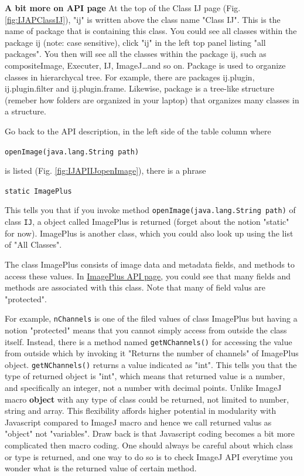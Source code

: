 \documentclass[11pt,a4paper,oneside]{report}
\newcommand{\ilcom}[1]{\texttt{\small#1}}
\begin{document}
 \textbf{A bit more on API page} At the top of the Class IJ page (Fig.\ref{fig:IJAPClassIJ}),  "ij" is written above the class name "Class IJ". This is the name of package that is containing this class. You could see all classes within the package ij (note: case sensitive), click "ij" in the left top panel listing "all packages".  You then will see all the classes within the package ij, such as compositeImage, Executer, IJ, ImageJ\dots and so on. Package is used to organize classes in hierarchycal tree. For example, there are packages ij.plugin, ij.plugin.filter and ij.plugin.frame. Likewise, package is a tree-like structure (remeber how folders are organized in your laptop) that organizes many classes in a structure. 
  
Go back to the API description, in the left side of the table column   where 

\ilcom{openImage(java.lang.String path) } 

is listed (Fig. \ref{fig:IJAPIIJopenImage}), there is a phrase 

\ilcom{static ImagePlus} 

This tells you that if you invoke method \ilcom{openImage(java.lang.String path)} of class \ilcom{IJ}, a object called ImagePlus is returned (forget about the notion "static" for now). ImagePlus is another class, which you could also look up using the list of "All Classes".  

The class ImagePlus consists of image data and metadata fields, and methods to access these values. In \href{http://rsb.info.nih.gov/ij/developer/api/ij/ImagePlus.html}{ImagePlus API page}, you could see that many fields and methods are associated with this class. Note that many of field valus are "protected". 

For example, \ilcom{nChannels} is one of the filed values of class ImagePlus but having a notion "protected" means that you cannot simply access from outside the class itself. Instead, there is a method named \ilcom{getNChannels()} for accessing the value from outside which by invoking it "Returns the number of channels" of ImagePlus object. \ilcom{getNChannels()} returns a value indicated as "int". This tells you that the type of returned object is "int", which means that returned value is a number, and specifically an integer, not a number with decimal points. Unlike ImageJ macro \textbf{object} with any type of class could be returned, not limited to number, string and array. This flexibility affords higher potential in modularity with Javascript compared to ImageJ macro and hence we call returned valus as "object" not "variables". Draw back is that Javascript coding becomes a bit more complicated then macro coding. One should always be careful about which class or type is returned, and one way to do so is to check ImageJ API everytime you wonder what is the returned value of certain method.  
\end{document}
